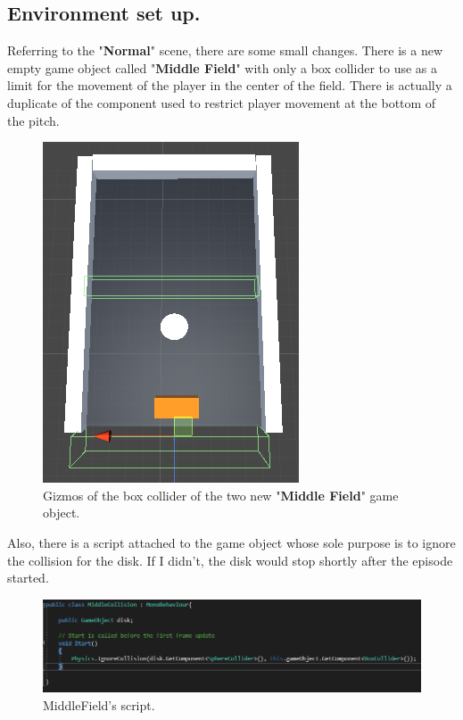 \documentclass[12pt]{article}
\begin{document}
	\subsection{Environment set up.}
	
	Referring to the "\textbf{Normal}" scene, there are some small changes. There is a new empty game object called "\textbf{Middle Field}" with only a box collider to use as a limit for the movement of the player in the center of the field. There is actually a duplicate of the component used to restrict player movement at the bottom of the pitch.
	
	 \begin{figure}[hbt!]
	 	\centering
	 	\includegraphics[width= 0.59
	 	\textwidth]{images/MiddleField.png}
	 	\caption{Gizmos of the box collider of the two new "\textbf{Middle Field}" game object.}
	 \end{figure}
	
	\noindent
	Also, there is a script attached to the game object whose sole purpose is to ignore the collision for the disk. If I didn't, the disk would stop shortly after the episode started.
	
	\begin{figure}[hbt!]
		\centering
		\includegraphics[width= 1
		\textwidth]{images/MiddleCollisionCode.png}
		\caption{MiddleField's script.}
	\end{figure}
	
\end{document}
